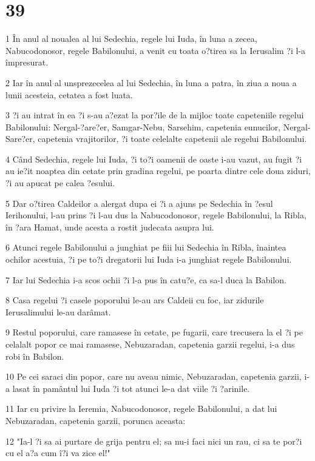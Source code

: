\chapter{39}

\par 1 În anul al noualea al lui Sedechia, regele lui Iuda, în luna a zecea, Nabucodonosor, regele Babilonului, a venit cu toata o?tirea sa la Ierusalim ?i l-a împresurat.
\par 2 Iar în anul al unsprezecelea al lui Sedechia, în luna a patra, în ziua a noua a lunii acesteia, cetatea a fost luata.
\par 3 ?i au intrat în ea ?i s-au a?ezat la por?ile de la mijloc toate capeteniile regelui Babilonului: Nergal-?are?er, Samgar-Nebu, Sarsehim, capetenia eunucilor, Nergal-Sare?er, capetenia vrajitorilor, ?i toate celelalte capetenii ale regelui Babilonului.
\par 4 Când Sedechia, regele lui Iuda, ?i to?i oamenii de oaste i-au vazut, au fugit ?i au ie?it noaptea din cetate prin gradina regelui, pe poarta dintre cele doua ziduri, ?i au apucat pe calea ?esului.
\par 5 Dar o?tirea Caldeilor a alergat dupa ei ?i a ajuns pe Sedechia în ?esul Ierihonului, l-au prins ?i l-au dus la Nabucodonosor, regele Babilonului, la Ribla, în ?ara Hamat, unde acesta a rostit judecata asupra lui.
\par 6 Atunci regele Babilonului a junghiat pe fiii lui Sedechia în Ribla, înaintea ochilor acestuia, ?i pe to?i dregatorii lui Iuda i-a junghiat regele Babilonului.
\par 7 Iar lui Sedechia i-a scos ochii ?i l-a pus în catu?e, ca sa-l duca la Babilon.
\par 8 Casa regelui ?i casele poporului le-au ars Caldeii cu foc, iar zidurile Ierusalimului le-au darâmat.
\par 9 Restul poporului, care ramasese în cetate, pe fugarii, care trecusera la el ?i pe celalalt popor ce mai ramasese, Nebuzaradan, capetenia garzii regelui, i-a dus robi în Babilon.
\par 10 Pe cei saraci din popor, care nu aveau nimic, Nebuzaradan, capetenia garzii, i-a lasat în pamântul lui Iuda ?i tot atunci le-a dat viile ?i ?arinile.
\par 11 Iar cu privire la Ieremia, Nabucodonosor, regele Babilonului, a dat lui Nebuzaradan, capetenia garzii, porunca aceasta:
\par 12 "Ia-l ?i sa ai purtare de grija pentru el; sa nu-i faci nici un rau, ci sa te por?i cu el a?a cum î?i va zice el!"
